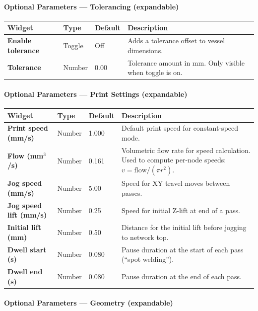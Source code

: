 \documentclass[11pt,letterpaper]{article}
\newcommand{\gui}[1]{\textcolor{guicolor}{\textsf{\textbf{#1}}}}
\begin{document}
\paragraph{Optional Parameters --- Tolerancing (expandable)}

\begin{longtable}{@{}L{3.5cm} l l L{5cm}@{}}
\toprule
\textbf{Widget} & \textbf{Type} & \textbf{Default} & \textbf{Description} \\
\midrule
\gui{Enable tolerance} & Toggle & Off & Adds a tolerance offset to vessel dimensions. \\
\gui{Tolerance} & Number & 0.00 & Tolerance amount in mm. Only visible when toggle is on. \\
\bottomrule
\end{longtable}

\paragraph{Optional Parameters --- Print Settings (expandable)}

\begin{longtable}{@{}L{3.5cm} l l L{5cm}@{}}
\toprule
\textbf{Widget} & \textbf{Type} & \textbf{Default} & \textbf{Description} \\
\midrule
\gui{Print speed (mm/s)} & Number & 1.000 & Default print speed for constant-speed mode. \\
\gui{Flow (mm$^3$/s)} & Number & 0.161 & Volumetric flow rate for speed calculation. Used to compute per-node speeds: $v = \text{flow} / (\pi r^2)$. \\
\gui{Jog speed (mm/s)} & Number & 5.00 & Speed for XY travel moves between passes. \\
\gui{Jog speed lift (mm/s)} & Number & 0.25 & Speed for initial Z-lift at end of a pass. \\
\gui{Initial lift (mm)} & Number & 0.50 & Distance for the initial lift before jogging to network top. \\
\gui{Dwell start (s)} & Number & 0.080 & Pause duration at the start of each pass (``spot welding''). \\
\gui{Dwell end (s)} & Number & 0.080 & Pause duration at the end of each pass. \\
\bottomrule
\end{longtable}

\paragraph{Optional Parameters --- Geometry (expandable)}
\end{document}
